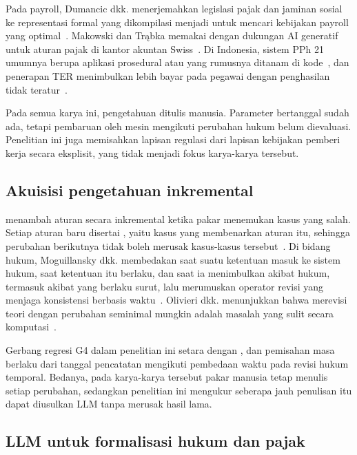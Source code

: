 Pada payroll, Dumancic dkk. menerjemahkan legislasi pajak dan jaminan sosial ke representasi formal yang dikompilasi menjadi  untuk mencari kebijakan payroll yang optimal~\cite{dumancic2021payroll}. Makowski dan Tr\k{a}bka memakai  dengan dukungan AI generatif untuk aturan pajak di kantor akuntan Swiss~\cite{makowski2025dmn}. Di Indonesia, sistem PPh 21 umumnya berupa aplikasi prosedural atau  yang rumusnya ditanam di kode~\cite{ramadhani2021grossup,yulistyawati2022payroll,kusuma2026pph21}, dan penerapan TER menimbulkan lebih bayar pada pegawai dengan penghasilan tidak teratur~\cite{sherra2025ter}.

Pada semua karya ini, pengetahuan ditulis manusia. Parameter bertanggal sudah ada, tetapi pembaruan  oleh mesin mengikuti perubahan hukum belum dievaluasi. Penelitian ini juga memisahkan lapisan regulasi dari lapisan kebijakan pemberi kerja secara eksplisit, yang tidak menjadi fokus karya-karya tersebut.

\subsection{Akuisisi pengetahuan inkremental}
\label{subsec:inkremental}

 menambah aturan secara inkremental ketika pakar menemukan kasus yang salah. Setiap aturan baru disertai , yaitu kasus yang membenarkan aturan itu, sehingga perubahan berikutnya tidak boleh merusak kasus-kasus tersebut~\cite{compton2021rippledown}. Di bidang hukum, Moguillansky dkk. membedakan saat suatu ketentuan masuk ke sistem hukum, saat ketentuan itu berlaku, dan saat ia menimbulkan akibat hukum, termasuk akibat yang berlaku surut, lalu merumuskan operator revisi yang menjaga konsistensi berbasis waktu~\cite{moguillansky2024temporalised}. Olivieri dkk. menunjukkan bahwa merevisi teori  dengan perubahan seminimal mungkin adalah masalah yang sulit secara komputasi~\cite{olivieri2025revising}.

Gerbang regresi G4 dalam penelitian ini setara dengan , dan pemisahan masa berlaku dari tanggal pencatatan mengikuti pembedaan waktu pada revisi hukum temporal. Bedanya, pada karya-karya tersebut pakar manusia tetap menulis setiap perubahan, sedangkan penelitian ini mengukur seberapa jauh penulisan itu dapat diusulkan LLM tanpa merusak hasil lama.

\subsection{LLM untuk formalisasi hukum dan pajak}
\label{subsec:llm-formal}

